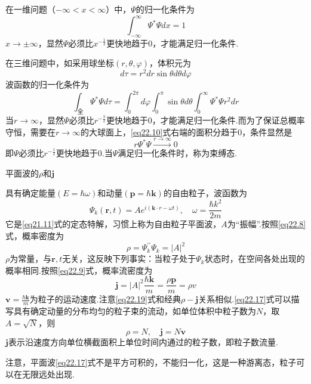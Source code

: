 在一维问题（$-\infty < x < \infty$）中，$\varPsi$的归一化条件为
\begin{equation}\label{eq22.15}
	\int_{-\infty}^{\infty}\varPsi^{*}\varPsi dx=1
\end{equation}
$x\rightarrow\pm\infty$，显然$\varPsi$必须比$x^{-\frac{1}{2}}$更快地趋于0，才能满足归一化条件.

在三维问题中，如采用球坐标$(r,\theta,\varphi)$，体积元为
\begin{equation*}
	d\tau=r^{2}dr\sin\theta d\theta d\varphi
\end{equation*}
波函数的归一化条件为
\begin{equation}\label{eq22.16}
	\int_{\text{全}}\varPsi^{*}\varPsi d\tau=\int_{0}^{2\pi}d\varphi\int_{0}^{\pi}\sin\theta d\theta\int_{0}^{\infty}\varPsi^{*}\varPsi r^{2}dr
\end{equation}\eqshort
当$r\rightarrow\infty$，显然$\varPsi$必须比$r^{-\frac{3}{2}}$更快地趋于0，才能满足归一化条件.而为了保证总概率守恒，需要在$r\rightarrow\infty$的大球面上，\eqref{eq22.10}式右端的面积分趋于0，条件显然是
\begin{equation*}
	r\varPsi^{*}\varPsi\stackrel{r\rightarrow\infty}{\longrightarrow}0
\end{equation*}\eqnormal
即$\varPsi$必须比$r^{-\frac{1}{2}}$更快地趋于0.当$\varPsi$满足归一化条件时，称为束缚态.

\example 平面波的$\rho$和$\boldsymbol{j}$

\solution 具有确定能量$(E=\hbar\omega)$和动量$(\boldsymbol{p}=\hbar\boldsymbol{k})$的自由粒子，波函数为
\begin{equation}\label{eq22.17}
	\varPsi_{k}(\boldsymbol{r},t)=Ae^{i(\boldsymbol{k}\cdot r-\omega t)},\quad \omega=\frac{\hbar k^{2}}{2m}
\end{equation}
它是\eqref{eq21.11}式的定态特解，习惯上称为自由粒子平面波，$A$为“振幅”.按照\eqref{eq22.8}式，概率密度为
\begin{equation}\label{eq22.18}
	\rho=\varPsi_{k}^{\prime\prime}\varPsi_{k}=|A|^{2}
\end{equation}
$\rho$为常量，与$\boldsymbol{r},t$无关，这反映下列事实：当粒子处于$\varPsi_{k}$状态时，在空间各处出现的概率相同.按照\eqref{eq22.9}式，概率流密度为
\begin{equation}\label{eq22.19}
	\boldsymbol{j}=|A|^{2}\frac{\hbar \boldsymbol{k}}{m}=\frac{\rho\boldsymbol{p}}{m}=\rho v
\end{equation}
$\boldsymbol{v}=\frac{\hbar \boldsymbol{k}}{m}$为粒子的运动速度.注意\eqref{eq22.19}式和经典$\rho-\boldsymbol{j}$关系相似.\eqref{eq22.17}式可以描写具有确定动量的分布均匀的粒子束的流动，如单位体积中粒子数为$N$，取$A=\sqrt{N}$，则
\begin{equation*}
	\rho=N,\quad \boldsymbol{j}=N\boldsymbol{v}
\end{equation*}
$\boldsymbol{j}$表示沿速度方向单位横截面积上单位时间内通过的粒子数，即粒子数流量.

注意，平面波\eqref{eq22.17}式不是平方可积的，不能归一化，这是一种游离态，粒子可以在无限远处出现.







